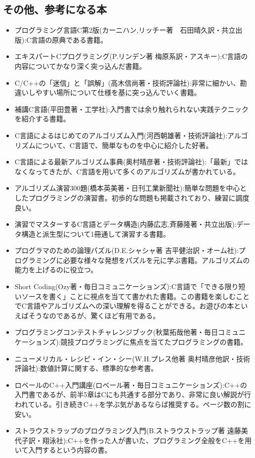 \subsection*{その他、参考になる本}
\begin{itemize}
 \item プログラミング言語C第2版(カーニハン,リッチー著　石田晴久訳・共立出版):C言語の原典である書籍。
 \item エキスパートCプログラミング(P.リンデン著 梅原系訳・アスキー):C言語の内容についてかなり深く突っ込んだ書籍。
 \item C/C++の「迷信」と「誤解」(高木信尚著・技術評論社):非常に細かい、勘違いしやすい場所について仕様を基に突っ込んでいく書籍。
 \item 補講C言語(平田豊著・工学社):入門書では余り触れられない実践テクニックを紹介する書籍。
 \item C言語によるはじめてのアルゴリズム入門(河西朝雄著・技術評論社):アルゴリズムについて、C言語で、簡単なものを中心に紹介した好著。
 \item C言語による最新アルゴリズム事典(奥村晴彦著・技術評論社):「最新」ではなくなってきたが、C言語を用いて多くのアルゴリズムが書かれている。
 \item アルゴリズム演習300題(橋本英美著・日刊工業新聞社):簡単な問題を中心としたプログラミングの演習書。初歩的な問題も掲載されており、練習に調度良い。
 \item 演習でマスターするC言語とデータ構造(内藤広志,斉藤隆著・共立出版):データ構造と派生型について1冊通して演習する書籍。
 \item プログラマのための論理パズル(D.E.シャシャ著 吉平健治訳・オーム社):プログラミングに必要な様々な発想をパズルを元に学ぶ書籍。アルゴリズムの能力を上げるのに役立つ。
 \item Short Coding(Ozy著・毎日コミュニケーションズ):C言語で「できる限り短いソースを書く」ことに視点を当てて書かれた書籍。この書籍を楽しむことでC言語やアルゴリズムへの深い理解を得ることができる。お遊びの本といえばそうなのであるが、驚くほど有用である。
 \item プログラミングコンテストチャレンジブック(秋葉拓哉他著・毎日コミュニケーションズ):競技プログラミングに焦点を当てたプログラミングの書籍。
 \item ニューメリカル・レシピ・イン・シー(W.H.プレス他著 奥村晴彦他訳・技術評論社):数値計算に関する、標準的な参考書。
 \item ロベールのC++入門講座(ロベール著・毎日コミュニケーションズ):C++の入門書であるが、前半5章はCにも共通する部分であり、非常に良い解説が行われている。引き続きC++を学ぶ気があるならば推奨する。ページ数の割に安い。
 \item ストラウストラップのプログラミング入門(B.ストラウストラップ著 遠藤美代子訳・翔泳社):C++を作った人が書いた、プログラミング全般をC++を用いて入門するという内容の書。
\end{itemize}
